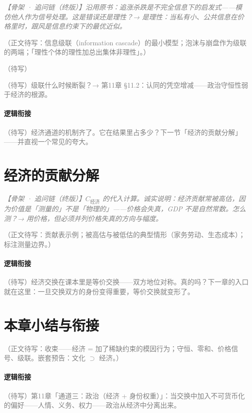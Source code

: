 \documentclass[../../main2.tex]{subfiles}
\begin{document}
	\textcolor{gray}{\textit{【骨架 · 追问链（终版）】沿用原书：追涨杀跌是不完全信息下的启发式——模仿他人作为信号处理。这是错误还是理性？→ 是理性：当私有小、公共信息在价格里时，跟风是信息约束下的最优近似。}}

	\textcolor{gray}{（正文待写：信息级联（information cascade）的最小模型；泡沫与崩盘作为级联的两端；「理性个体的理性加总出集体非理性」。）}

	\begin{readingnote}
		\textcolor{gray}{（待写）}
	\end{readingnote}

	\begin{reader_anticipation}
		\item \textcolor{gray}{（待写）级联什么时候断裂？→ 第11章 §11.2：认同的凭空增减——政治守恒性弱于经济的根源。}
	\end{reader_anticipation}

	\paragraph*{逻辑衔接}
	\textcolor{gray}{（待写）经济通道的机制齐了。它在结果里占多少？下一节「经济的贡献分解」——并直视一个常见的夸大。}

	\section{经济的贡献分解}
	\label{sec:econ-contribution}

	\textcolor{gray}{\textit{【骨架 · 追问链（终版）】$C_{\text{经济}}$ 的代入计算。诚实说明：经济贡献常被高估，因为价值是「测量的」不是「物理的」——价格会失真，GDP 不是自然常数。怎么测？→ 用价格，但必须并列价格失真的方向与幅度。}}

	\textcolor{gray}{（正文待写：贡献表示例；被高估与被低估的典型情形（家务劳动、生态成本）；\lowfreq 标注测量边界。）}

	\paragraph*{逻辑衔接}
	\textcolor{gray}{（待写）经济交换在课本里是等价交换——双方地位对称。真的吗？下一章的入口就在这里：一旦交换双方的身份变得重要，等价交换就变形了。}

	\section{本章小结与衔接}
	\label{sec:econ-summary}

	\textcolor{gray}{（正文待写：收束——经济 = 加了稀缺约束的模因行为；守恒、零和、价格信号、级联。嵌套预告：文化 $\supset$ 经济。）}

	\paragraph*{逻辑衔接}
	\textcolor{gray}{（待写）第11章「通道三：政治（经济 + 身份权重）」：当交换中加入不可货币化的偏好——人情、义务、权力——政治从经济中分离出来。}
\end{document}
